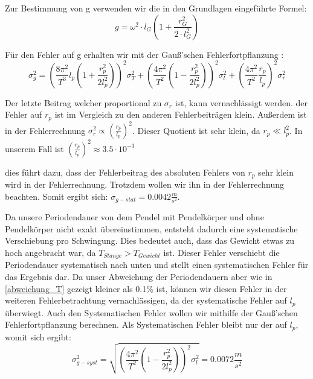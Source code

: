 \documentclass[twoside]{protokoll}
\begin{document}
 Zur Bestimmung von g verwenden wir die in den Grundlagen eingeführte Formel:
\begin{equation}
    g = \omega^2 \cdot l_G \left( 1 + \frac{r_G^2}{2 \cdot l_G^2} \right)
    \label{eq:pendel_g}
\end{equation}

Für den Fehler auf g erhalten wir mit der Gauß'schen Fehlerfortpflanzung :
\begin{equation}
\sigma_g^2 = \left(\frac{8\pi^2}{T^3}l_p\left(1+\frac{r_p^2}{2l_p^2}\right)\right)^2 \sigma_T^2 + \left(\frac{4\pi^2}{T^2}\left(1-\frac{r_p^2}{2l_p^2}\right)\right)^2\sigma_l^2 + \left(\frac{4\pi^2}{T^2}\frac{r_p}{l_p}\right)^2\sigma_r^2 
\end{equation}

Der letzte Beitrag welcher proportional zu $\sigma_r$ ist, kann vernachlässigt werden. 
der Fehler auf $r_p$ ist im Vergleich zu den anderen Fehlerbeiträgen klein. 
Außerdem ist in der Fehlerrechnung $\sigma_r^2 \propto \left(\frac{r_p}{l_p}\right)^2$.
Dieser Quotient ist sehr klein, da $ r_p \ll l_p^2 $. 
In unserem Fall ist $\left(\frac{r_p}{l_p}\right)^2 \approx 3.5\cdot10^{-3} $

dies führt dazu, dass der Fehlerbeitrag des absoluten Fehlers von $r_p$ sehr klein wird in der Fehlerrechnung.
Trotzdem wollen wir ihn in der Fehlerrechnung beachten. Somit ergibt sich: $\sigma_{g-stat} = 0.0042 \frac{m}{s^2}$.

Da unsere Periodendauer von dem Pendel mit Pendelkörper und ohne Pendelkörper nicht exakt übereinstimmen, entsteht dadurch eine systematische Verschiebung pro Schwingung.
Dies bedeutet auch, dass das Gewicht etwas zu hoch angebracht war, da $T_{Stange} > T_{Gewicht}$ ist.
Dieser Fehler verschiebt die Periodendauer systematisch nach unten und stellt einen systematischen Fehler für das Ergebnis dar.
Da unser Abweichung der Periodendauern aber wie in \ref{abweichung_T} gezeigt kleiner als 0.1\% ist, können wir diesen Fehler in der weiteren Fehlerbetrachtung vernachlässigen, da der systematische Fehler auf $l_p$ überwiegt.
Auch den Systematischen Fehler wollen wir mithilfe der Gauß'schen Fehlerfortpflanzung berechnen.
Als Systematischen Fehler bleibt nur der auf $l_p$, womit sich ergibt:
\begin{equation}
    \sigma_{g-syst}^2 =  \sqrt{\left(\frac{4\pi^2}{T^2}\left(1-\frac{r_p^2}{2l_p^2}\right)\right)^2\sigma_l^2} = 0.0072 \frac{m}{s^2}
\end{equation}
\end{document}
